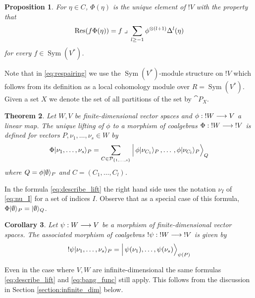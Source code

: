 \documentclass[english,letter paper,12pt,reqno]{article}
\DeclarePairedDelimiter\ket{\lvert}{\rangle}
\newtheorem{theorem}{Theorem}[section]
\newtheorem{proposition}[theorem]{Proposition}
\newtheorem{corollary}[theorem]{Corollary}
\theoremstyle{example}
\numberwithin{equation}{section}
\def\vacu{\ket{\emptyset}}
\DeclareMathOperator{\Sym}{Sym}
\begin{document}
\begin{proposition}\label{prop:respairing} For $\eta \in C$, $\Phi(\eta)$ is the unique element of ${!}V$ with the property that
\begin{equation}\label{eq:respairing}
\operatorname{Res}\!\,( f \Phi(\eta) ) = f\; \lrcorner \;\sum_{l \ge -1} \phi^{\otimes (l+1)} \Delta^l(\eta)
\end{equation}
for every $f \in \Sym(V^*)$.
\end{proposition}

Note that in \eqref{eq:respairing} we use the $\Sym(V^*)$-module structure on ${!} V$ which follows from its definition as a local cohomology module over $R = \Sym(V^*)$. Given a set $X$ we denote the set of all partitions of the set by $\cat{P}_X$.

\begin{theorem}\label{theorem:describe_lifting} Let $W, V$ be finite-dimensional vector spaces and $\phi: {!}W \longrightarrow V$ a linear map. The unique lifting of $\phi$ to a morphism of coalgebras $\Phi: {!}W \longrightarrow {!}V$ is defined for vectors $P, \nu_1,\ldots,\nu_s \in W$ by
\begin{equation}\label{eq:describe_lift}
\Phi \ket{ \nu_1, \ldots, \nu_s }_P = \sum_{C \in \cat{P}_{\{1,\ldots,s\}}} \Big|\, \phi \ket{\nu_{C_{1}} }_P\,, \ldots \,, \phi \ket{ \nu_{C_{l}}}_P \Big\rangle_Q
\end{equation}
where $Q = \phi \vacu_P$ and $C = (C_1,\ldots,C_l)$.
\end{theorem}

In the formula \eqref{eq:describe_lift} the right hand side uses the notation $\nu_I$ of \eqref{eq:nu_I} for a set of indices $I$. Observe that as a special case of this formula, $\Phi \vacu_P = \vacu_Q$.

\begin{corollary}\label{corollary:bang_func} Let $\psi: W \longrightarrow V$ be a morphism of finite-dimensional vector spaces. The associated morphism of coalgebras $!\psi: {!}W \longrightarrow {!}V$ is given by
\begin{equation}\label{eq:bang_func}
!\psi \ket{\nu_1, \ldots, \nu_s}_P = \Big|\, \psi(\nu_{1}), \ldots, \psi(\nu_{s}) \Big\rangle_{\psi(P)}
\end{equation}
\end{corollary}

Even in the case where $V, W$ are infinite-dimensional the same formulas \eqref{eq:describe_lift} and \eqref{eq:bang_func} still apply. This follows from the discussion in Section \ref{section:infinite_dim} below.
\end{document}
